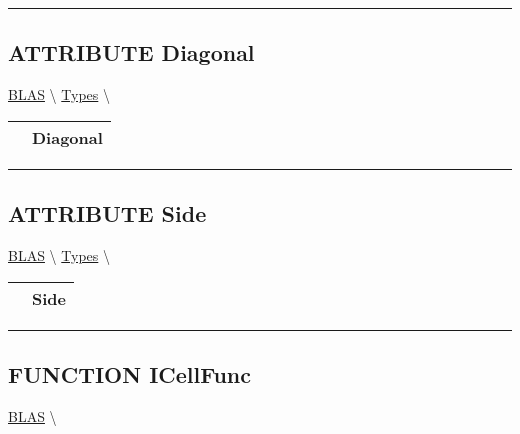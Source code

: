 \par


\rule{\linewidth}{0.5pt}
\subsection*{\textsf{\colorbox{headtoc}{\color{white} ATTRIBUTE}
Diagonal}}

\hypertarget{ecldoc:ecldoc-Diagonal}{}
\hspace{0pt} \hyperlink{ecldoc:blas}{BLAS} \textbackslash 
\hspace{0pt} \hyperlink{ecldoc:BLAS.Types}{Types} \textbackslash 

{\renewcommand{\arraystretch}{1.5}
\begin{tabularx}{\textwidth}{|>{\raggedright\arraybackslash}l|X|}
\hline
\hspace{0pt}\mytexttt{\color{red} } & \textbf{Diagonal} \\
\hline
\end{tabularx}
}

\par


\rule{\linewidth}{0.5pt}
\subsection*{\textsf{\colorbox{headtoc}{\color{white} ATTRIBUTE}
Side}}

\hypertarget{ecldoc:ecldoc-Side}{}
\hspace{0pt} \hyperlink{ecldoc:blas}{BLAS} \textbackslash 
\hspace{0pt} \hyperlink{ecldoc:BLAS.Types}{Types} \textbackslash 

{\renewcommand{\arraystretch}{1.5}
\begin{tabularx}{\textwidth}{|>{\raggedright\arraybackslash}l|X|}
\hline
\hspace{0pt}\mytexttt{\color{red} } & \textbf{Side} \\
\hline
\end{tabularx}
}

\par


\rule{\linewidth}{0.5pt}


\subsection*{\textsf{\colorbox{headtoc}{\color{white} FUNCTION}
ICellFunc}}

\hypertarget{ecldoc:blas.icellfunc}{}
\hspace{0pt} \hyperlink{ecldoc:blas}{BLAS} \textbackslash 


